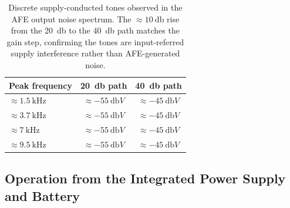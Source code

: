 \begin{table}[h!]
\centering
\begin{tabular}{lcc}
\hline
\textbf{Peak frequency} & \textbf{\SI{20}{\decibel} path} & \textbf{\SI{40}{\decibel} path} \\
\hline
$\approx\SI{1.5}{\kilo\hertz}$ & $\approx\SI{-55}{\decibel V}$ & $\approx\SI{-45}{\decibel V}$ \\
$\approx\SI{3.7}{\kilo\hertz}$ & $\approx\SI{-55}{\decibel V}$ & $\approx\SI{-45}{\decibel V}$ \\
$\approx\SI{7}{\kilo\hertz}$   & $\approx\SI{-55}{\decibel V}$ & $\approx\SI{-45}{\decibel V}$ \\
$\approx\SI{9.5}{\kilo\hertz}$ & $\approx\SI{-55}{\decibel V}$ & $\approx\SI{-45}{\decibel V}$ \\
\hline
\end{tabular}
\caption{Discrete supply-conducted tones observed in the AFE output noise spectrum. The $\approx\SI{10}{\decibel}$ rise from the \SI{20}{\decibel} to the \SI{40}{\decibel} path matches the gain step, confirming the tones are input-referred supply interference rather than AFE-generated noise.}
\label{tab:res_afe_supply_peaks}
\end{table}



\subsection{Operation from the Integrated Power Supply and Battery}
\label{sec:res_afe_pcb_power}

